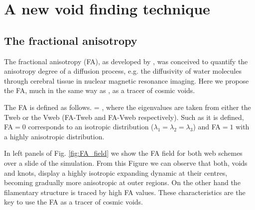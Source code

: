 \documentclass[a4,useAMS,usenatbib,usegraphicx]{latex/mn2e}
\begin{document}
\section{A new void finding technique}
\label{sec:bulk_voids}


\subsection{The fractional anisotropy}
\label{subsec:FA_voids}


The fractional anisotropy (FA), as developed by \citet{Basser95}, was 
conceived to quantify the anisotropy degree of a diffusion process, e.g. 
the diffusivity of water molecules through cerebral tissue in nuclear
magnetic resonance imaging. 
Here we propose the FA, much in the same way as \citet{Libeskind13},
as a tracer of cosmic voids. 


The FA is defined as follows.
{{} = ,}
where the eigenvalues are taken from either the Tweb or the Vweb 
(FA-Tweb and FA-Vweb respectively). Such as it is defined, FA$=0$ 
corresponds to an isotropic distribution ($\lambda_1=\lambda_2=\lambda_3$) 
and FA$=1$ with a highly anisotropic distribution.


In left panels of Fig. \ref{fig:FA_field} we show the FA field for both 
web schemes over a slide of the simulation. 
From this Figure we can observe that both, voids and knots, display a highly 
isotropic expanding dynamic at their centres, becoming gradually more
anisotropic at outer regions. 
On the other hand the filamentary structure is traced by high FA
values. These characteristics are the key to use the FA as a tracer of
cosmic voids. 
\end{document}
